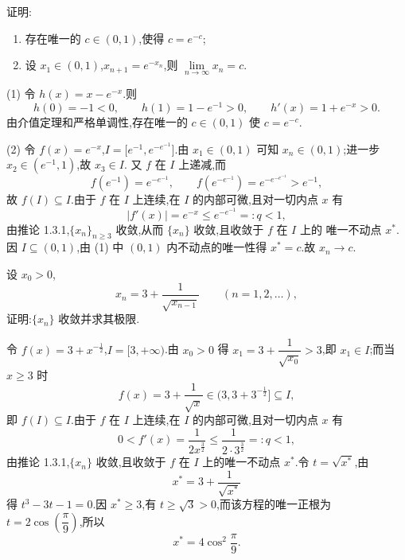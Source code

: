 \begin{example}
  证明:
  \begin{enumerate}
    \item 存在唯一的 $c\in(0,1)$,使得 $c=e^{-c}$;
    \item 设 $x_1\in(0,1)$,$x_{n+1}=e^{-x_n}$,则
          $\displaystyle \lim\limits_{n\to\infty}x_n=c$.
  \end{enumerate}
\end{example}
\exampleblank

\begin{solution}

  (1) 令 $h(x)=x-e^{-x}$.则
  \[
    h(0)=-1<0,
    \qquad h(1)=1-e^{-1}>0,
    \qquad h'(x)=1+e^{-x}>0.
  \]
  由介值定理和严格单调性,存在唯一的 $c\in(0,1)$ 使 $c=e^{-c}$.

  (2) 令 $f(x)=e^{-x}$,$I=\lbrack e^{-1},e^{-e^{-1}}\rbrack$.由 $x_1\in(0,1)$ 可知
  $x_n\in(0,1)$;进一步 $x_2\in(e^{-1},1)$,故 $x_3\in I$.
  又 $f$ 在 $I$ 上递减,而
  \[
    f(e^{-1})=e^{-e^{-1}},
    \qquad f(e^{-e^{-1}})=e^{-e^{-e^{-1}}}>e^{-1},
  \]
  故 $f(I)\subseteq I$.由于 $f$ 在 $I$ 上连续,在 $I$ 的内部可微,且对一切内点 $x$ 有
  \[
    |f'(x)|=e^{-x}\leq e^{-e^{-1}}=:q<1,
  \]
  由推论 1.3.1,$\{x_n\}_{n\geq3}$ 收敛,从而 $\{x_n\}$ 收敛,且收敛于 $f$ 在 $I$ 上的
  唯一不动点 $x^*$.因 $I\subseteq(0,1)$,由 (1) 中 $(0,1)$ 内不动点的唯一性得
  $x^*=c$.故 $x_n\to c$.
\end{solution}

\begin{example}
  设 $x_0>0$,
  \[
    x_n=3+\dfrac{1}{\sqrt{x_{n-1}}}\qquad(n=1,2,\ldots),
  \]
  证明:$\{x_n\}$ 收敛并求其极限.
\end{example}
\exampleblank

\begin{solution}
  令 $f(x)=3+x^{-\frac{1}{2}}$,$I=\lbrack3,+\infty)$.由 $x_0>0$ 得
  $x_1=3+\dfrac{1}{\sqrt{x_0}}>3$,即 $x_1\in I$;而当 $x\geq3$ 时
  \[
    f(x)=3+\dfrac{1}{\sqrt x}\in(3,3+3^{-\frac{1}{2}}\rbrack\subseteq I,
  \]
  即 $f(I)\subseteq I$.由于 $f$ 在 $I$ 上连续,在 $I$ 的内部可微,且对一切内点 $x$ 有
  \[
    0<f'(x)=\dfrac{1}{2x^{\frac{3}{2}}}\leq\dfrac{1}{2\cdot3^{\frac{3}{2}}}=:q<1,
  \]
  由推论 1.3.1,$\{x_n\}$ 收敛,且收敛于 $f$ 在 $I$ 上的唯一不动点 $x^*$.令
  $t=\sqrt{x^*}$,由
  \[
    x^*=3+\dfrac{1}{\sqrt{x^*}}
  \]
  得 $t^3-3t-1=0$.因 $x^*\geq3$,有 $t\geq\sqrt3>0$,而该方程的唯一正根为
  $t=2\cos\left(\dfrac{\pi}{9}\right)$,所以
  \[
    x^*=4\cos^2\dfrac{\pi}{9}.
  \]
\end{solution}

